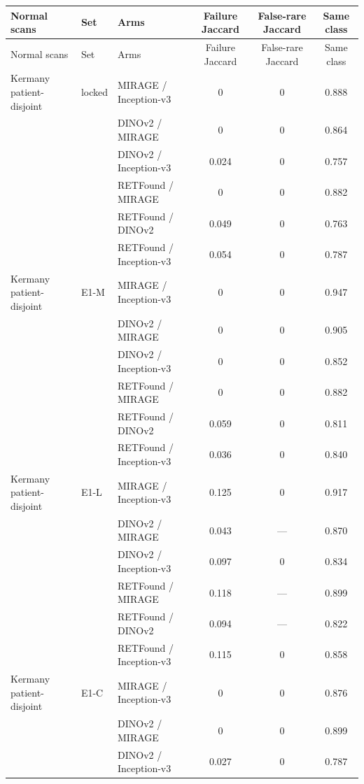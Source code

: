 \begin{longtable}{@{}lllccc@{}}
\toprule
Normal scans & Set & Arms & Failure Jaccard & False-rare Jaccard & Same class \\
\midrule
\endfirsthead
\toprule
Normal scans & Set & Arms & Failure Jaccard & False-rare Jaccard & Same class \\
\midrule
\endhead
\bottomrule
\endfoot
\bottomrule
\endlastfoot
Kermany patient-disjoint & locked & MIRAGE / Inception-v3 & 0 & 0 & 0.888 \\
 &  & DINOv2 / MIRAGE & 0 & 0 & 0.864 \\
 &  & DINOv2 / Inception-v3 & 0.024 & 0 & 0.757 \\
 &  & RETFound / MIRAGE & 0 & 0 & 0.882 \\
 &  & RETFound / DINOv2 & 0.049 & 0 & 0.763 \\
 &  & RETFound / Inception-v3 & 0.054 & 0 & 0.787 \\
\addlinespace[1pt]
Kermany patient-disjoint & E1-M & MIRAGE / Inception-v3 & 0 & 0 & 0.947 \\
 &  & DINOv2 / MIRAGE & 0 & 0 & 0.905 \\
 &  & DINOv2 / Inception-v3 & 0 & 0 & 0.852 \\
 &  & RETFound / MIRAGE & 0 & 0 & 0.882 \\
 &  & RETFound / DINOv2 & 0.059 & 0 & 0.811 \\
 &  & RETFound / Inception-v3 & 0.036 & 0 & 0.840 \\
\addlinespace[1pt]
Kermany patient-disjoint & E1-L & MIRAGE / Inception-v3 & 0.125 & 0 & 0.917 \\
 &  & DINOv2 / MIRAGE & 0.043 & --- & 0.870 \\
 &  & DINOv2 / Inception-v3 & 0.097 & 0 & 0.834 \\
 &  & RETFound / MIRAGE & 0.118 & --- & 0.899 \\
 &  & RETFound / DINOv2 & 0.094 & --- & 0.822 \\
 &  & RETFound / Inception-v3 & 0.115 & 0 & 0.858 \\
\addlinespace[1pt]
Kermany patient-disjoint & E1-C & MIRAGE / Inception-v3 & 0 & 0 & 0.876 \\
 &  & DINOv2 / MIRAGE & 0 & 0 & 0.899 \\
 &  & DINOv2 / Inception-v3 & 0.027 & 0 & 0.787 \\

\end{longtable}
